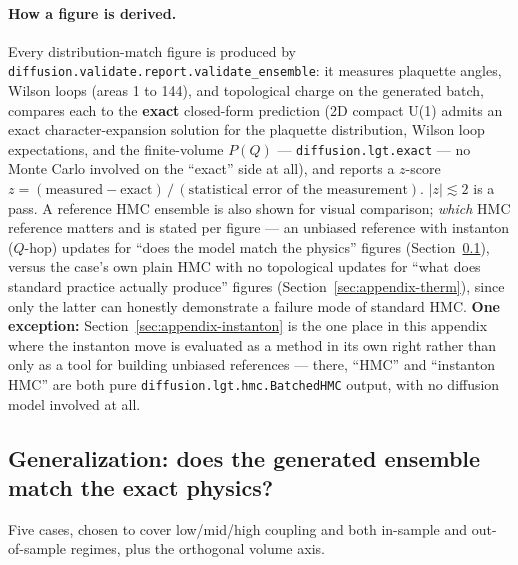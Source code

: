 \paragraph{How a figure is derived.} Every distribution-match figure is
produced by \texttt{diffusion.validate.report.validate\_ensemble}: it
measures plaquette angles, Wilson loops (areas 1 to 144), and topological
charge on the generated batch, compares each to the \textbf{exact}
closed-form prediction (2D compact U(1) admits an exact character-expansion
solution for the plaquette distribution, Wilson loop expectations, and the
finite-volume $P(Q)$ --- \texttt{diffusion.lgt.exact} --- no Monte Carlo
involved on the ``exact'' side at all), and reports a $z$-score
$z = (\text{measured} - \text{exact})\,/\,(\text{statistical error of the
measurement})$. $|z| \lesssim 2$ is a pass. A reference HMC ensemble is also
shown for visual comparison; \emph{which} HMC reference matters and is
stated per figure --- an unbiased reference with instanton ($Q$-hop) updates
for ``does the model match the physics'' figures
(Section~\ref{sec:appendix-gen}), versus the case's own plain HMC with no
topological updates for ``what does standard practice actually produce''
figures (Section~\ref{sec:appendix-therm}), since only the latter can
honestly demonstrate a failure mode of standard HMC. \textbf{One exception:}
Section~\ref{sec:appendix-instanton} is the one place in this appendix where
the instanton move is evaluated as a method in its own right rather than
only as a tool for building unbiased references --- there, ``HMC'' and
``instanton HMC'' are both pure \texttt{diffusion.lgt.hmc.BatchedHMC}
output, with no diffusion model involved at all.

\subsection{Generalization: does the generated ensemble match the exact physics?}
\label{sec:appendix-gen}

Five cases, chosen to cover low/mid/high coupling and both in-sample and
out-of-sample regimes, plus the orthogonal volume axis.

